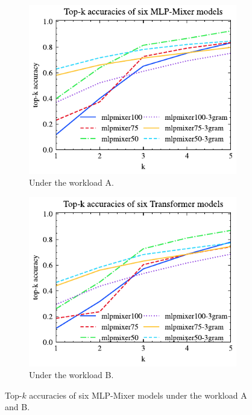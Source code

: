 \begin{figure}[!th]
	\centering
	\begin{subfigure}{0.45\textwidth}
		\centering
		\includegraphics[]{my/graphics/top_k_mlpmixer_A.pdf}
		\caption{Under the workload A.}
		\label{fig:top_k_mlpmixer_A}
	\end{subfigure}
	\hfill
	\begin{subfigure}{0.45\textwidth}
		\centering
		\includegraphics[]{my/graphics/top_k_mlpmixer_B.pdf}
		\caption{Under the workload B.}
		\label{fig:top_k_mlpmixer_B}
	\end{subfigure}
	\caption{Top-$k$ accuracies of six MLP-Mixer models under the workload A and B.}
	\label{fig:top_k_mlpmixer_all}
\end{figure}
